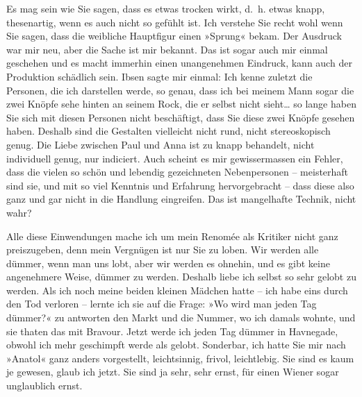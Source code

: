 \pstart
           Es mag sein wie Sie sagen, dass es etwas trocken wirkt, d. h. etwas knapp,
               thesenartig, wenn es auch nicht so gefühlt ist. Ich verstehe Sie recht wohl wenn Sie
               sagen, dass die weibliche Hauptfigur einen »Sprung« bekam. Der Ausdruck war mir neu,
               aber die Sache ist mir bekannt. Das ist sogar auch mir einmal geschehen und es macht
               immerhin einen unangenehmen Eindruck, kann auch der Produktion schädlich sein. Ibsen sagte mir einmal: Ich kenne zuletzt die
               Personen, die ich darstellen werde, so genau, dass
               ich bei meinem Mann sogar die zwei Knöpfe sehe hinten an seinem Rock, die er selbst
               nicht sieht{\dots} so lange haben Sie sich mit diesen Personen
               nicht beschäftigt, dass Sie diese zwei Knöpfe gesehen haben. Deshalb sind die
               Gestalten vielleicht nicht rund, nicht stereoskopisch genug. Die Liebe zwischen Paul
               und Anna ist zu knapp behandelt, nicht individuell genug, nur indiciert. Auch scheint
               es mir gewissermassen ein Fehler, dass die vielen so schön und lebendig gezeichneten
               Nebenpersonen – meisterhaft sind sie, und mit so viel Kenntnis und Erfahrung
               hervorgebracht – dass diese also ganz und gar nicht in die Handlung eingreifen. Das
               ist mangelhafte Technik, nicht wahr?\pend
           
\pstart
           Alle diese Einwendungen mache ich um mein Renomée als Kritiker nicht ganz
               preiszugeben, denn mein Vergnügen ist nur Sie zu loben. Wir werden alle dümmer, wenn
               man uns lobt, aber wir werden es ohnehin, und es gibt keine angenehmere Weise, dümmer
               zu werden. Deshalb liebe ich selbst so sehr gelobt zu werden. Als ich noch meine
               beiden kleinen Mädchen hatte – {\pb}ich habe
                  eins durch den Tod
               verloren – lernte ich sie auf die Frage: »Wo wird man jeden Tag dümmer?« zu antworten
               den Markt und die Nummer, wo ich damals wohnte, und sie thaten das mit Bravour. Jetzt
               werde ich jeden Tag dümmer in Havnegade, obwohl
               ich mehr geschimpft werde als gelobt. Sonderbar, ich hatte Sie mir nach »Anatol« ganz anders vorgestellt, leichtsinnig,
               frivol, leichtlebig. Sie sind es kaum je gewesen, glaub ich jetzt. Sie sind ja sehr,
               sehr ernst, für einen Wiener sogar unglaublich
               ernst.\pend
           
